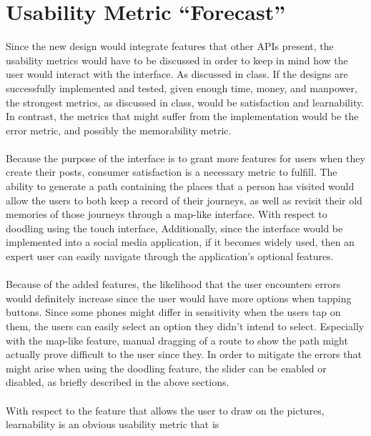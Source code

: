 \documentclass[11pt]{article}
\begin{document}
\section{Usability Metric ``Forecast''}
   \indent 
   \indent Since the new design would integrate features that other APIs present, the usability metrics would have to be discussed in order to keep in mind how the user would interact with the interface. As discussed in class. If the designs are successfully implemented and tested, given enough time, money, and manpower, the strongest metrics, as discussed in class, would be satisfaction and learnability. In contrast, the metrics that might suffer from the implementation would be the error metric, and possibly the memorability metric.\\ \\
   \indent Because the purpose of the interface is to grant more features for users when they create their posts, consumer satisfaction is a necessary metric to fulfill. The ability to generate a path containing the places that a person has visited would allow the users to both keep a record of their journeys, as well as revisit their old memories of those journeys through a map-like interface. With respect to doodling using the touch interface, Additionally, since the interface would be implemented into a social media application, if it becomes widely used, then an expert user can easily navigate through the application's optional features.\\ \\
   \indent Because of the added features, the likelihood that the user encounters errors would definitely increase since the user would have more options when tapping buttons. Since some phones might differ in sensitivity when the users tap on them, the users can easily select an option they didn't intend to select. Especially with the map-like feature, manual dragging of a route to show the path might actually prove difficult to the user since they. In order to mitigate the errors that might arise when using the doodling feature, the slider can be enabled or disabled, as briefly described in the above sections.\\ \\
   \indent With respect to the feature that allows the user to draw on the pictures, learnability is an obvious usability metric that is \\

\clearpage


\end{document}
